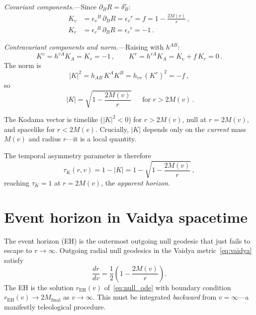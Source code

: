 \documentclass[prl,twocolumn,superscriptaddress,longbibliography,floatfix]{revtex4-2}
\newcommand{\tauasym}{\tau}
\begin{document}
\emph{Covariant components.}---Since
$\partial_B R = \delta^r_B$:
\begin{align}
  K_v &= \epsilon_v{}^B\,\partial_B R
       = \epsilon_v{}^r = f = 1 - \frac{2M(v)}{r}\,,
  \label{eq:Kv}\\
  K_r &= \epsilon_r{}^B\,\partial_B R
       = \epsilon_r{}^r = -1\,.
  \label{eq:Kr}
\end{align}

\emph{Contravariant components and norm.}---Raising with
$h^{AB}$:
\begin{equation}
  K^v = h^{vA}K_A = K_r = -1\,,\qquad
  K^r = h^{rA}K_A = K_v + f\,K_r = 0\,.
\end{equation}
The norm is
\begin{equation}
  |K|^2 = h_{AB}\,K^A K^B
  = h_{vv}\,(K^v)^2 = -f\,,
  \label{eq:Knorm}
\end{equation}
so
\begin{equation}
  \boxed{\;|K| = \sqrt{1 - \frac{2M(v)}{r}}\;\;}
  \quad\text{for } r > 2M(v)\,.
  \label{eq:Knorm_result}
\end{equation}

The Kodama vector is timelike ($|K|^2 < 0$) for
$r > 2M(v)$, null at $r = 2M(v)$, and spacelike for
$r < 2M(v)$.
Crucially, $|K|$ depends only on the \emph{current} mass
$M(v)$ and radius $r$---it is a local quantity.

The temporal asymmetry parameter is therefore
\begin{equation}
  \tauasym_K(r,v) = 1 - |K| = 1 - \sqrt{1 - \frac{2M(v)}{r}}\,,
  \label{eq:tauK}
\end{equation}
reaching $\tauasym_K = 1$ at $r = 2M(v)$, the
\emph{apparent horizon}.

\section{Event horizon in Vaidya spacetime}
\label{sec:EH}

The event horizon (EH) is the outermost outgoing null
geodesic that just fails to escape to $r \to \infty$.
Outgoing radial null geodesics in the Vaidya
metric~\eqref{eq:vaidya} satisfy
\begin{equation}
  \frac{dr}{dv} = \frac{1}{2}\!\left(1
  - \frac{2M(v)}{r}\right).
  \label{eq:null_ode}
\end{equation}
The EH is the solution $r_{\text{EH}}(v)$
of~\eqref{eq:null_ode} with boundary condition
$r_{\text{EH}}(v) \to 2M_{\text{final}}$ as
$v \to \infty$.
This must be integrated \emph{backward} from
$v = \infty$---a manifestly teleological procedure.
\end{document}
